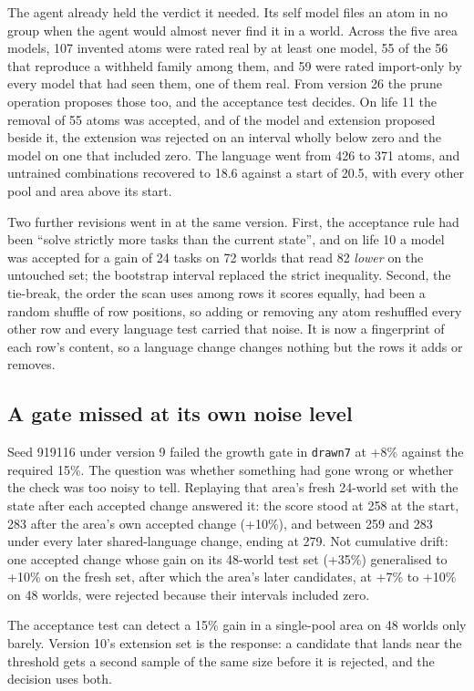 \documentclass[11pt]{article}
\begin{document}
The agent already held the verdict it needed. Its self model files an atom in no group when the agent would almost never find it in a world. Across the five area models, 107 invented atoms were rated real by at least one model, 55 of the 56 that reproduce a withheld family among them, and 59 were rated import-only by every model that had seen them, one of them real. From version 26 the prune operation proposes those too, and the acceptance test decides. On life 11 the removal of 55 atoms was accepted, and of the model and extension proposed beside it, the extension was rejected on an interval wholly below zero and the model on one that included zero. The language went from 426 to 371 atoms, and untrained combinations recovered to 18.6 against a start of 20.5, with every other pool and area above its start.

Two further revisions went in at the same version. First, the acceptance rule had been ``solve strictly more tasks than the current state'', and on life 10 a model was accepted for a gain of 24 tasks on 72 worlds that read 82 \emph{lower} on the untouched set; the bootstrap interval replaced the strict inequality. Second, the tie-break, the order the scan uses among rows it scores equally, had been a random shuffle of row positions, so adding or removing any atom reshuffled every other row and every language test carried that noise. It is now a fingerprint of each row's content, so a language change changes nothing but the rows it adds or removes.

\subsection{A gate missed at its own noise level}
\label{sec:noise}

Seed 919116 under version 9 failed the growth gate in \texttt{drawn7} at +8\% against the required 15\%. The question was whether something had gone wrong or whether the check was too noisy to tell. Replaying that area's fresh 24-world set with the state after each accepted change answered it: the score stood at 258 at the start, 283 after the area's own accepted change (+10\%), and between 259 and 283 under every later shared-language change, ending at 279. Not cumulative drift: one accepted change whose gain on its 48-world test set (+35\%) generalised to +10\% on the fresh set, after which the area's later candidates, at +7\% to +10\% on 48 worlds, were rejected because their intervals included zero.

The acceptance test can detect a 15\% gain in a single-pool area on 48 worlds only barely. Version 10's extension set is the response: a candidate that lands near the threshold gets a second sample of the same size before it is rejected, and the decision uses both.
\end{document}
